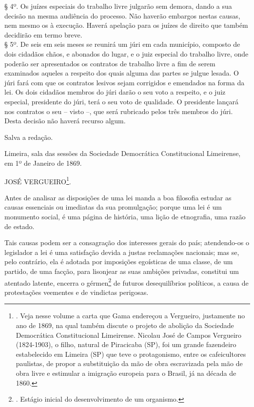 § 4º. Os juízes especiais do trabalho livre julgarão sem demora, dando a
sua decisão na mesma audiência do processo. Não haverão embargos nestas
causas, nem mesmo os à execução. Haverá apelação para os juízes de
direito que também decidirão em termo breve.\\
§ 5º. De seis em seis meses se reunirá um júri em cada município,
composto de dois cidadãos chãos, e abonados do lugar, e o juiz especial
do trabalho livre, onde poderão ser apresentados os contratos de
trabalho livre a fim de serem examinados aqueles a respeito dos quais
alguma das partes se julgue lesada. O júri fará com que os contratos
lesivos sejam corrigidos e emendados na forma da lei. Os dois cidadãos
membros do júri darão o seu voto a respeito, e o juiz especial,
presidente do júri, terá o seu voto de qualidade. O presidente lançará
nos contratos o seu -- visto --, que será rubricado pelos três membros
do júri. Desta decisão não haverá recurso algum.

Salva a redação.

Limeira, sala das sessões da Sociedade Democrática Constitucional
Limeirense, em 1º de Janeiro de 1869.

JOSÉ VERGUEIRO\footnote{. Veja nesse volume a carta que Gama endereçou a
  Vergueiro, justamente no ano de 1869, na qual também discute o projeto
  de abolição da Sociedade Democrática Constitucional Limeirense.
  Nicolau José de Campos Vergueiro (1824-1903), o filho, natural de
  Piracicaba (SP), foi um grande fazendeiro estabelecido em Limeira (SP)
  que teve o protagonismo, entre os cafeicultores paulistas, de propor a
  substituição da mão de obra escravizada pela mão de obra livre e
  estimular a imigração europeia para o Brasil, já na década de 1860.}.

Antes de analisar as disposições de uma lei manda a boa filosofia
estudar as causas essenciais ou imediatas da sua promulgação; porque uma
lei é um monumento social, é uma página de história, uma lição de
etnografia, uma razão de estado.

Tais causas podem ser a consagração dos interesses gerais do país;
atendendo-os o legislador a lei é uma satisfação devida a justas
reclamações nacionais; mas se, pelo contrário, ela é adotada por
imposições egoísticas de uma classe, de um partido, de uma facção, para
lisonjear as suas ambições privadas, constitui um atentado latente,
encerra o gérmen\footnote{. Estágio inicial do desenvolvimento de um
  organismo.} de futuros desequilíbrios políticos, a causa de
protestações veementes e de vindictas perigosas.

